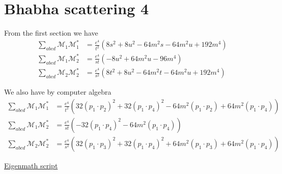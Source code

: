 

\section*{Bhabha scattering 4}

From the first section we have
\begin{align*}
\sum_{abcd}\mathcal M_1\mathcal M_1^*
&=\frac{e^4}{t^2}\left(8 s^2 + 8 u^2 - 64 m^2 s - 64 m^2 u + 192 m^4\right)
\\
\sum_{abcd}\mathcal M_1\mathcal M_2^*
&=\frac{e^4}{st}\left(-8 u^2 + 64 m^2 u - 96 m^4\right)
\\
\sum_{abcd}\mathcal M_2\mathcal M_2^*
&=\frac{e^4}{s^2}\left(8 t^2 + 8 u^2 - 64 m^2 t - 64 m^2 u + 192 m^4\right)
\end{align*}

We also have by computer algebra
\begin{align*}
\sum_{abcd}\mathcal M_1\mathcal M_1^*&=\frac{e^4}{t^2}
\left(32 (p_1\cdot p_2)^2 + 32 (p_1\cdot p_4)^2 - 64 m^2 (p_1\cdot p_2) + 64 m^2 (p_1\cdot p_4)\right)
\\
\sum_{abcd}\mathcal M_1\mathcal M_2^*&=\frac{e^4}{st}
\left(-32 (p_1\cdot p_4)^2 - 64 m^2 (p_1\cdot p_4)\right)
\\
\sum_{abcd}\mathcal M_2\mathcal M_2^*&=\frac{e^4}{s^2}
\left(32 (p_1\cdot p_3)^2 + 32 (p_1\cdot p_4)^2 + 64 m^2 (p_1\cdot p_3) + 64 m^2 (p_1\cdot p_4)\right)
\end{align*}

\href{https://georgeweigt.github.io/examples/bhabha-scattering-4-demo.html}{Eigenmath script}


